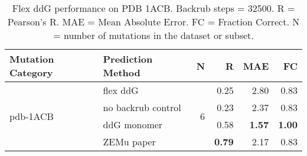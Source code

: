 \begin{table}
  \begin{tabular}{llrrrr}
\toprule
Mutation Category &   Prediction Method &  N &    R &  MAE &   FC \\
\midrule
 \multirow{ 4}{*}{pdb-1ACB} & flex ddG & \multirow{ 4}{*}{6} & 0.25 & 2.80 & 0.83  \\
 & no backrub control & & 0.23 & 2.37 & 0.83  \\
 & ddG monomer & & 0.58 & \textbf{1.57} & \textbf{1.00}  \\
 & ZEMu paper & & \textbf{0.79} & 2.17 & 0.83  \\
\bottomrule
\end{tabular}
  \caption[Flex ddG performance on PDB 1ACB]{
    Flex ddG performance on PDB 1ACB. Backrub steps = 32500. R = Pearson's R. MAE = Mean Absolute Error. FC = Fraction Correct. N = number of mutations in the dataset or subset.
  } \label{tab:table-pdb-1ACB}
\end{table}

